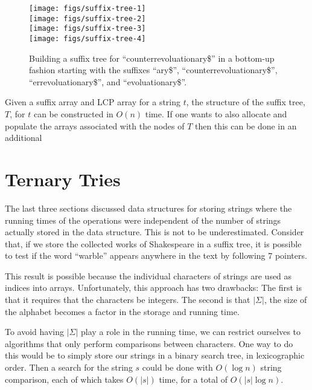 \begin{figure}
\begin{center}
\texttt{[image: figs/suffix-tree-1]} \\[1em]
\texttt{[image: figs/suffix-tree-2]} \\[1em]
\texttt{[image: figs/suffix-tree-3]} \\[1em]
\texttt{[image: figs/suffix-tree-4]} \\[1em]
\end{center}
\caption{Building a suffix tree for ``counterrevoluationary\$'' in a bottom-up fashion starting with the suffixes ``ary\$'', ``counterrevoluationary\$'', ``errevoluationary\$'', and ``evoluationary\$''.}
\end{figure}

\begin{thm}
  Given a suffix array and LCP array for a string $t$, the structure of
  the suffix tree, $T$, for $t$ can be constructed in $O(n)$ time.  If one
  wants to also allocate and populate the arrays associated with the
  nodes of $T$ then this can be done in an additional
\end{thm}


\section{Ternary Tries}

The last three sections discussed data structures for storing strings
where the running times of the operations were independent of the
number of strings actually stored in the data structure.  This is not
to be underestimated.  Consider that, if we store the collected works
of Shakespeare in a suffix tree, it is possible to test if the word
``warble'' appears anywhere in the text by following 7 pointers.

This result is possible because the individual characters of strings
are used as indices into arrays.  Unfortunately, this approach has two
drawbacks: The first is that it requires that the characters be integers.
The second is that $|\Sigma|$, the size of the alphabet becomes a factor
in the storage and running time.

To avoid having $|\Sigma|$ play a role in the running time, we can
restrict ourselves to algorithms that only perform comparisons between
characters.  One way to do this would be to simply store our strings in
a binary search tree, in lexicographic order.  Then a search for the
string $s$ could be done with $O(\log n)$ string comparison, each of
which takes $O(|s|)$ time, for a total of $O(|s|\log n)$.

